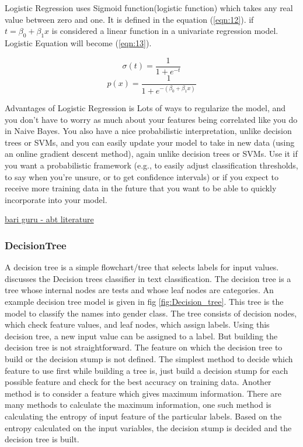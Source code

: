 Logistic Regression uses Sigmoid function(logistic function) which takes any real value between zero and one. It is defined in the equation (\ref{eqn:12}). if $t= \beta_0 + \beta_1x$ is considered a linear function in a univariate regression model. Logistic Equation will become (\ref{eqn:13}). 




\begin{equation}
\label{eqn:12}
\sigma(t) = \frac{1}{1+e^{-t}}
\end{equation}
\begin{equation}
\label{eqn:13}
p(x) = \frac{1}{1 + e^{-(\beta_0 + \beta_1x)}}
\end{equation}



Advantages of Logistic Regression is Lots of ways to regularize the model, and you don’t have to worry as much about your features being correlated like you do in Naive Bayes. You also have a nice probabilistic interpretation, unlike decision trees or SVMs, and you can easily update your model to take in new data (using an online gradient descent method), again unlike decision trees or SVMs. Use it if you want a probabilistic framework (e.g., to easily adjust classification thresholds, to say when you’re unsure, or to get confidence intervals) or if you expect to receive more training data in the future that you want to be able to quickly incorporate into your model.

\underline{bari guru - abt literature }

\subsubsection{DecisionTree}
A decision tree is a simple flowchart/tree that selects labels for input values. \cite{BirdKleinLoper09} discusses the Decision trees classifier in text classification. The decision tree is a tree whose internal nodes are tests and whose leaf nodes are categories. An example decision tree model is given in fig \ref{fig:Decision_tree}. This tree is the model to classify the names into gender class. The tree consists of decision nodes, which check feature values, and leaf nodes, which assign labels. Using this decision tree, a new input value can be assigned to a label. But building the decision tree is not straightforward. The feature on which the decision tree to build or the decision stump is not defined. The simplest method to decide which feature to use first while building a tree is, just build a decision stump for each possible feature and check for the best accuracy on training data. Another method is to consider a feature which gives maximum information. There are many methods to calculate the maximum information, one such method is calculating the entropy of input feature of the particular labels. Based on the entropy calculated on the input variables, the decision stump is decided and the decision tree is built.

